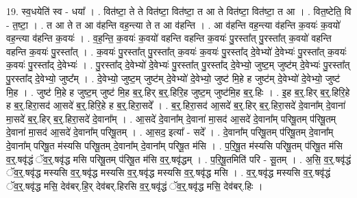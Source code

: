 \documentclass[17pt]{extarticle}
\begin{document}
19. स्व॒धयेति॑ स्व - धया᳚ । . वित॑ष्टा॒ ते ते वित॑ष्टा॒ वित॑ष्टा॒ त आ ते वित॑ष्टा॒ वित॑ष्टा॒ त आ । . वित॒ष्टेति॒ वि - त॒ष्टा॒ । . त आ ते त आ व॑हन्ति वह॒न्त्या ते त आ व॑हन्ति । . आ व॑हन्ति वह॒न्त्या व॑हन्ति क॒वयः॑ क॒वयो॑ वह॒न्त्या व॑हन्ति क॒वयः॑ । . व॒ह॒न्ति॒ क॒वयः॑ क॒वयो॑ वहन्ति वहन्ति क॒वयः॑ पु॒रस्ता᳚त् पु॒रस्ता᳚त् क॒वयो॑ वहन्ति वहन्ति क॒वयः॑ पु॒रस्ता᳚त् । . क॒वयः॑ पु॒रस्ता᳚त् पु॒रस्ता᳚त् क॒वयः॑ क॒वयः॑ पु॒रस्ता᳚द् दे॒वेभ्यो॑ दे॒वेभ्यः॑ पु॒रस्ता᳚त् क॒वयः॑ क॒वयः॑ पु॒रस्ता᳚द् दे॒वेभ्यः॑ । . पु॒रस्ता᳚द् दे॒वेभ्यो॑ दे॒वेभ्यः॑ पु॒रस्ता᳚त् पु॒रस्ता᳚द् दे॒वेभ्यो॒ जुष्ट॒म् जुष्ट॑म् दे॒वेभ्यः॑ पु॒रस्ता᳚त् पु॒रस्ता᳚द् दे॒वेभ्यो॒ जुष्ट᳚म् । . दे॒वेभ्यो॒ जुष्ट॒म् जुष्ट॑म् दे॒वेभ्यो॑ दे॒वेभ्यो॒ जुष्ट॑ मि॒हे ह जुष्ट॑म् दे॒वेभ्यो॑ दे॒वेभ्यो॒ जुष्ट॑ मि॒ह । . जुष्ट॑ मि॒हे ह जुष्ट॒म् जुष्ट॑ मि॒ह ब॒र्॒.हिर् ब॒र्॒.हिरि॒ह जुष्ट॒म् जुष्ट॑मि॒ह ब॒र्॒.हिः । . इ॒ह ब॒र्॒.हिर् ब॒र्॒.हिरि॒हे ह ब॒र्॒.हिरा॒सद॑ आ॒सदे॑ ब॒र्॒.हिरि॒हे ह ब॒र्॒.हिरा॒सदे᳚ । . ब॒र्॒.हिरा॒सद॑ आ॒सदे॑ ब॒र्॒.हिर् ब॒र्॒.हिरा॒सदे॑ दे॒वाना᳚म् दे॒वाना॑ मा॒सदे॑ ब॒र्॒.हिर् ब॒र्॒.हिरा॒सदे॑ दे॒वाना᳚म् । . आ॒सदे॑ दे॒वाना᳚म् दे॒वाना॑ मा॒सद॑ आ॒सदे॑ दे॒वाना᳚म् परिषू॒तम् प॑रिषू॒तम् दे॒वाना॑ मा॒सद॑ आ॒सदे॑ दे॒वाना᳚म् परिषू॒तम् । . आ॒सद॒ इत्या᳚ - सदे᳚ । . दे॒वाना᳚म् परिषू॒तम् प॑रिषू॒तम् दे॒वाना᳚म् दे॒वाना᳚म् परिषू॒त म॑स्यसि परिषू॒तम् दे॒वाना᳚म् दे॒वाना᳚म् परिषू॒त म॑सि । . प॒रि॒षू॒त म॑स्यसि परिषू॒तम् प॑रिषू॒त म॑सि व॒र्॒.षवृ॑द्धं ॅव॒र्॒.षवृ॑द्ध मसि परिषू॒तम् 
प॑रिषू॒त म॑सि व॒र्॒.षवृ॑द्धम् । . प॒रि॒षू॒तमिति॑ परि - सू॒तम् । . अ॒सि॒ व॒र्॒.षवृ॑द्धं ॅव॒र्॒.षवृ॑द्ध मस्यसि व॒र्॒.षवृ॑द्ध मस्यसि व॒र्॒.षवृ॑द्ध मस्यसि व॒र्॒.षवृ॑द्ध मसि । . व॒र्॒.षवृ॑द्ध मस्यसि व॒र्॒.षवृ॑द्धं ॅव॒र्॒.षवृ॑द्ध मसि॒ देव॑बर्.हि॒र् देव॑बर्.हिरसि व॒र्॒.षवृ॑द्धं ॅव॒र्॒.षवृ॑द्ध मसि॒ देव॑बर्.हिः । \newline
\end{document}
